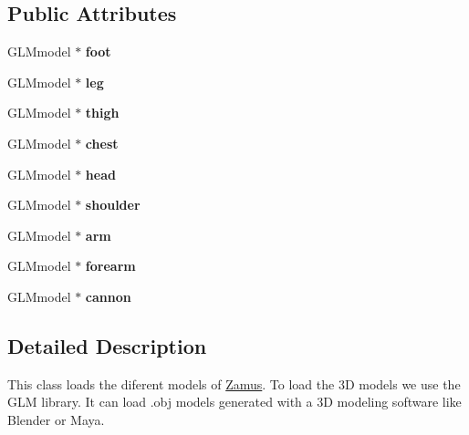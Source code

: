\subsection*{Public Attributes}
\begin{DoxyCompactItemize}
\item 
\hypertarget{classZamusModel_a5f48d524819bc235fbf20976382e1e65}{
GLMmodel $\ast$ {\bfseries foot}}
\label{classZamusModel_a5f48d524819bc235fbf20976382e1e65}

\item 
\hypertarget{classZamusModel_aa08ca7e76c849c5f024eca413e6038c8}{
GLMmodel $\ast$ {\bfseries leg}}
\label{classZamusModel_aa08ca7e76c849c5f024eca413e6038c8}

\item 
\hypertarget{classZamusModel_a1e001369254646878e95ee4a59ad2027}{
GLMmodel $\ast$ {\bfseries thigh}}
\label{classZamusModel_a1e001369254646878e95ee4a59ad2027}

\item 
\hypertarget{classZamusModel_a71227ce053148ed751d595e761b13ae4}{
GLMmodel $\ast$ {\bfseries chest}}
\label{classZamusModel_a71227ce053148ed751d595e761b13ae4}

\item 
\hypertarget{classZamusModel_a89be9319dbb314f4f109d8883bf57bf3}{
GLMmodel $\ast$ {\bfseries head}}
\label{classZamusModel_a89be9319dbb314f4f109d8883bf57bf3}

\item 
\hypertarget{classZamusModel_ac36621e70bce1c3c45585baec70b1a54}{
GLMmodel $\ast$ {\bfseries shoulder}}
\label{classZamusModel_ac36621e70bce1c3c45585baec70b1a54}

\item 
\hypertarget{classZamusModel_ad678c00b781a42daaf30d663ef63bb26}{
GLMmodel $\ast$ {\bfseries arm}}
\label{classZamusModel_ad678c00b781a42daaf30d663ef63bb26}

\item 
\hypertarget{classZamusModel_adc63bb792f1fcd349bccfb7544b4ea02}{
GLMmodel $\ast$ {\bfseries forearm}}
\label{classZamusModel_adc63bb792f1fcd349bccfb7544b4ea02}

\item 
\hypertarget{classZamusModel_aaa2eaa5ab7707b876fea59c285c608c2}{
GLMmodel $\ast$ {\bfseries cannon}}
\label{classZamusModel_aaa2eaa5ab7707b876fea59c285c608c2}

\end{DoxyCompactItemize}


\subsection{Detailed Description}
This class loads the diferent models of \hyperlink{classZamus}{Zamus}. To load the 3D models we use the GLM library. It can load .obj models generated with a 3D modeling software like Blender or Maya. 


